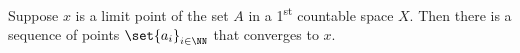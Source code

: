 \documentclass{fkpset}
\begin{document}
  \begin{problem}[6.18]
    Suppose $x$ is a limit point of the set $A$ in a
    1\textsuperscript{st} countable space $X$. Then there is a
    sequence of points $\set{a_i}_{i \in \NN}$ that converges to $x$.
  \end{problem}
  \begin{solution}
  \end{solution}
\end{document}
